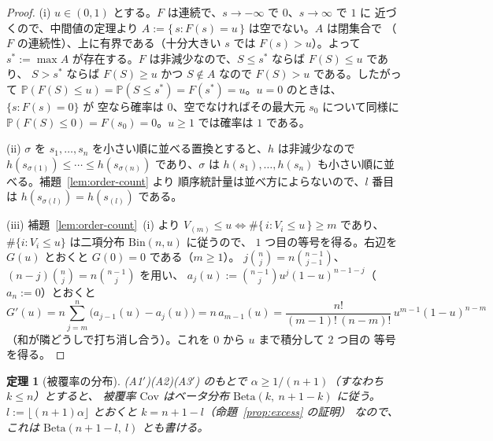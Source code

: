 \documentclass[a4paper,11pt]{jsarticle}
\theoremstyle{definition}
\theoremstyle{plain}
\newtheorem{theorem}[definition]{定理}
\theoremstyle{remark}
\newcommand{\Prob}{\mathbb{P}}
\begin{document}
\begin{proof}
  (i) $u\in(0,1)$ とする。$F$ は連続で、$s\to-\infty$ で $0$、$s\to\infty$ で $1$ に
  近づくので、中間値の定理より $A:=\{\,s: F(s)=u\,\}$ は空でない。$A$ は閉集合で
  （$F$ の連続性）、上に有界である（十分大きい $s$ では $F(s)>u$）。よって
  $s^*:=\max A$ が存在する。$F$ は非減少なので、$S\le s^*$ ならば $F(S)\le u$ であり、
  $S>s^*$ ならば $F(S)\ge u$ かつ $S\notin A$ なので $F(S)>u$ である。したがって
  $\Prob(F(S)\le u)=\Prob(S\le s^*)=F(s^*)=u$。$u=0$ のときは、$\{s:F(s)=0\}$ が
  空なら確率は $0$、空でなければその最大元 $s_0$ について同様に
  $\Prob(F(S)\le0)=F(s_0)=0$。$u\ge1$ では確率は $1$ である。

  (ii) $\sigma$ を $s_1,\dots,s_n$ を小さい順に並べる置換とすると、$h$ は非減少なので
  $h(s_{\sigma(1)})\le\cdots\le h(s_{\sigma(n)})$ であり、$\sigma$ は
  $h(s_1),\dots,h(s_n)$ も小さい順に並べる。補題~\ref{lem:order-count} より
  順序統計量は並べ方によらないので、$l$ 番目は $h(s_{\sigma(l)})=h(s_{(l)})$ である。

  (iii) 補題~\ref{lem:order-count}~(i) より $V_{(m)}\le u\iff\#\{\,i: V_i\le u\,\}\ge m$
  であり、$\#\{i: V_i\le u\}$ は二項分布 $\mathrm{Bin}(n,u)$ に従うので、
  $1$ つ目の等号を得る。右辺を $G(u)$ とおくと $G(0)=0$ である（$m\ge1$）。
  $j\binom{n}{j}=n\binom{n-1}{j-1}$、$(n-j)\binom{n}{j}=n\binom{n-1}{j}$ を用い、
  $a_j(u):=\binom{n-1}{j}u^j(1-u)^{n-1-j}$（$a_n:=0$）とおくと
  \begin{equation*}
    G'(u)=n\sum_{j=m}^{n}\bigl(a_{j-1}(u)-a_j(u)\bigr)=n\,a_{m-1}(u)
    =\frac{n!}{(m-1)!\,(n-m)!}\,u^{m-1}(1-u)^{n-m}
  \end{equation*}
  （和が隣どうしで打ち消し合う）。これを $0$ から $u$ まで積分して $2$ つ目の
  等号を得る。
\end{proof}

\begin{theorem}[被覆率の分布]
  \label{thm:cond-coverage-beta}
  (A1$'$)(A2)(A3$'$) のもとで $\alpha\ge1/(n+1)$（すなわち $k\le n$）とすると、
  被覆率 $\mathrm{Cov}$ はベータ分布 $\mathrm{Beta}(k,\ n+1-k)$ に従う。
  $l:=\lfloor(n+1)\alpha\rfloor$ とおくと $k=n+1-l$（命題~\ref{prop:excess} の証明）
  なので、これは $\mathrm{Beta}(n+1-l,\ l)$ とも書ける。
\end{theorem}
\end{document}
